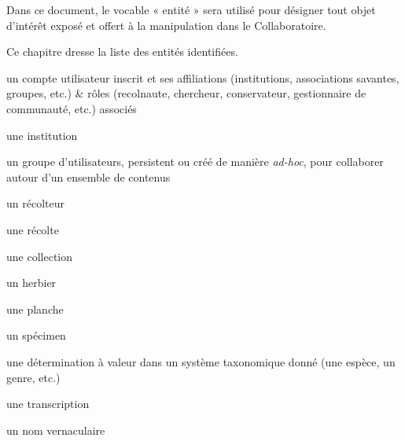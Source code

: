 \startchapter[title={Les types d'entités ReColNat+},reference=c:entites]

Dans ce document, le vocable « entité » sera utilisé pour désigner tout objet d'intérêt exposé et offert à la manipulation dans le Collaboratoire.

Ce chapitre dresse la liste des entités identifiées.

\startsection[title={Identification des entités}]

\startsubsection[title={Entités sociales}]

\startitemize
	\item un compte utilisateur inscrit et ses affiliations (institutions, associations savantes, groupes, etc.) & rôles (recolnaute, chercheur, conservateur, gestionnaire de communauté, etc.) associés
	\item une institution
	\item un groupe d'utilisateurs, persistent ou créé de manière {\it ad-hoc}, pour collaborer autour d'un ensemble de contenus
\stopitemize

\startsubsection[title={Entités scientifiques},reference=c:entites:scientifiques]

\startitemize
	\item un récolteur
	\item une récolte
	\item une collection
	\item un herbier
	\item une planche
	\item un spécimen
	\item une détermination à valeur dans un système taxonomique donné (une espèce, un genre, etc.)
	\item une transcription
	\item un nom vernaculaire
\stopitemize

